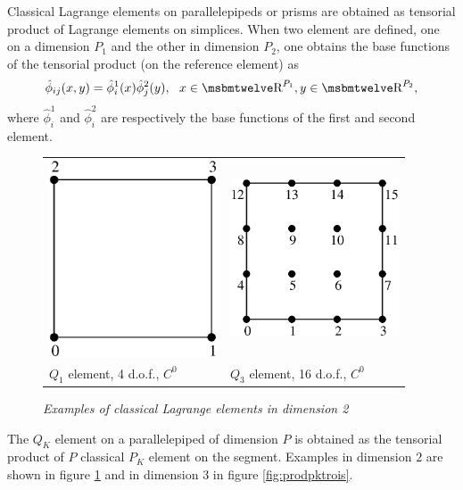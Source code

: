 \documentclass[10pt,a4paper]{article}
\begin{document}
Classical Lagrange elements on parallelepipeds or prisms are obtained as tensorial product of Lagrange elements on simplices. When two element are defined, one on a dimension $P_1$ and the other in dimension $P_2$, one obtains the base functions of the tensorial product (on the reference element) as
$$ \hat{\phi}_{ij}(x,y) = \hat{\phi}^1_i(x) \hat{\phi}^2_j(y), \ \ x \in \Reel^{P_1}, y \in  \Reel^{P_2}, $$
where $\hat{\phi}^1_i$ and $\hat{\phi}^2_i$ are respectively the base functions of the first and second element.


\begin{figure}[H]
  \begin{center} \begin{tabular}{m{7cm}m{7cm}}
    \includegraphics[width=5cm,angle=0]{getfemlist_quad_Q1.eps} & \includegraphics[width=5cm,angle=0]{getfemlist_quad_Q3.eps} \\
    $Q_1$ element, 4 d.o.f., $C^0$ & $Q_3$ element, 16 d.o.f., $C^0$ \\
  \end{tabular} \end{center}
  \caption{ \it Examples of classical Lagrange elements in dimension 2} \label{fig:prodpkdeux}
\end{figure}

The $Q_K$ element on a parallelepiped of dimension $P$ is obtained as the tensorial product of $P$ classical $P_K$ element on the segment. Examples in dimension $2$ are shown in figure \ref{fig:prodpkdeux} and in dimension $3$ in figure \ref{fig:prodpktrois}. \\
\end{document}
